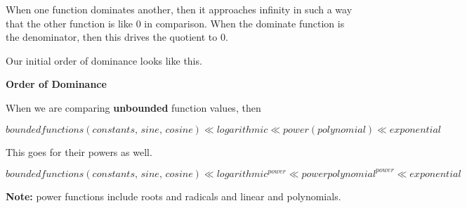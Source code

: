 \documentclass{ximera}
\begin{document}
When one function dominates another, then it approaches infinity in such a way that the other function is like $0$ in comparison. When the dominate function is the denominator, then this drives the quotient to $0$.


Our initial order of dominance looks like this. 


\begin{summary} \textbf{\textcolor{red!70!yellow}{Order of Dominance}}


When we are comparing \textbf{unbounded} function values, then 

\[   bounded functions (constants, \, sine, \, cosine)  \ll logarithmic \ll power (polynomial) \ll  exponential  \]



This goes for their powers as well. 


\[   bounded functions (constants, \, sine, \, cosine)  \ll logarithmic^{power} \ll power polynomial^{power} \ll  exponential  \]



\end{summary}

\textbf{Note:} power functions include roots and radicals and linear and polynomials.
\end{document}
